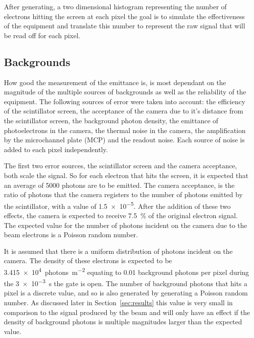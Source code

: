 After generating, a two dimensional histogram representing the number of
electrons hitting the screen at each pixel the goal is to simulate the
effectiveness of the equipment and translate this number to represent the raw
signal that will be read off for each pixel.

\subsection{Backgrounds}

How good the measurement of the emittance is, is most dependant on the magnitude
of the multiple sources of backgrounds as well as the reliability of the
equipment. The following sources of error were taken into account: the
efficiency of the scintillator screen, the acceptance of the camera due to it's
distance from the scintillator screen, the background photon density, the
emittance of photoelectrons in the camera, the thermal noise in the camera, the
amplification by the microchannel plate (MCP) and the readout noise.  Each
source of noise is added to each pixel independently.


The first two error sources, the scintillator screen and the camera acceptance,
both scale the signal. So for each electron that hits the screen, it is
expected that an average of \num{5000} photons are to be emitted. The
camera acceptance, is the ratio of photons that the camera registers to the
number of photons emitted by the scintillator, with a value of \num{1.5e-5}.
After the addition of these two effects, the camera is expected to receive
\SI{7.5}{\percent} of the original electron signal. The expected value for the
number of photons incident on the camera due to the beam electrons is a Poisson
random number.

It is assumed that there is a uniform distribution of photons incident on the
camera. The density of these electrons is expected to be
\SI{3.415e4}{photons\per\meter\squared} equating to \num{0.01} background
photons per pixel during the \SI{3e-3}{\second} the gate is open. The number of
background photons that hits a pixel is a discrete value, and so is also
generated by generating a Poisson random number.  As discussed later in
Section~\ref{sec:results} this value is very small in comparison to the signal
produced by the beam and will only have an effect if the density of background
photons is multiple magnitudes larger than the expected value.

